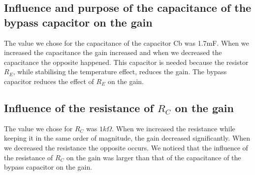 \subsection{Influence and purpose of the capacitance of the bypass capacitor on the gain}
The value we chose for the capacitance of the capacitor Cb was 1.7mF. When we increased the capacitance the gain increased and when we decreased the capacitance the opposite happened. This capacitor is needed because the resistor $R_E$, while stabilising the temperature effect, reduces the gain. The bypass capacitor reduces the effect of $R_E$ on the gain.

\subsection{Influence of the resistance of $R_C$ on the gain}
The value we chose for $R_C$  was $1k\Omega$. When we increased the resistance while keeping it in the same order of magnitude, the gain decreased significantly. When we decreased the resistance the opposite occurs. We noticed that the influence of the resistance of $R_C$ on the gain was larger than that of the capacitance of the bypass capacitor on the gain.
